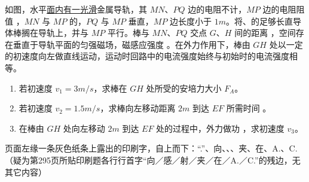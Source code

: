 \begin{problem}
如图，水平\underline{面内有一光滑}金属导轨，其 $MN$、$PQ$ 边的电阻不计，$MP$ 边的电阻阻值 ，$MN$ 与 $MP$ 的，$PQ$ 与 $MP$ 垂直，$MP$ 边长度小于 $1\unit{m}$。将、的足够长直导体棒搁在导轨上，并与 $MP$ 平行。棒与 $MN$、$PQ$ 交点 $G$、$H$ 间的距离 ，空间存在垂直于导轨平面的匀强磁场，磁感应强度 。在外力作用下，棒由 $GH$ 处以一定的初速度向左做直线运动，运动时回路中的电流强度始终与初始时的电流强度相等。


\begin{enumerate}[label=(\arabic*)]
\item 若初速度 $v_1=3\unit{m/s}$，求棒在 $GH$ 处所受的安培力大小 $F_A$。
\item 若初速度 $v_2=1.5\unit{m/s}$，求棒向左移动距离 $2\unit{m}$ 到达 $EF$ 所需时间 。
\item 在棒由 $GH$ 处向左移动 $2\unit{m}$ 到达 $EF$ 处的过程中，外力做功 ，求初速度 $v_3$。
\end{enumerate}
\end{problem}
页面左缘一条灰色纸条上露出的印刷字，自上而下：“.”、向、、、夹、在、A.、C.（疑为第295页所贴印刷题各行行首字“向／感／射／夹／在／A.／C.”的残边，无其它内容）
